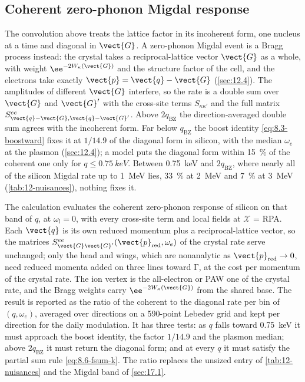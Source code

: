 \subsection{Coherent zero-phonon Migdal response}

The convolution above treats the lattice factor in its incoherent form, one nucleus at a time and diagonal in $\vect{G}$. A zero-phonon Migdal event is a Bragg process instead: the crystal takes a reciprocal-lattice vector $\vect{G}$ as a whole, with weight $\ee^{-2W_\kappa(\vect{G})}$ and the structure factor of the cell, and the electrons take exactly $\vect{p} = \vect{q} - \vect{G}$ (\cref{sec:12.4}). The amplitudes of different $\vect{G}$ interfere, so the rate is a double sum over $\vect{G}$ and $\vect{G}'$ with the cross-site terms $S_{\kappa\kappa'}$ and the full matrix $S^{ee}_{\vect{q}-\vect{G},\vect{q}-\vect{G}'}$. Above $2q_{\mathrm{BZ}}$ the direction-averaged double sum agrees with the incoherent form. Far below $q_{\mathrm{BZ}}$ the boost identity \cref{eq:8.3-boostward} fixes it at $1/14.9$ of the diagonal form in silicon, with the median $\omega_e$ at the plasmon (\cref{sec:12.4}); a model puts the diagonal form within \SI{15}{\percent} of the coherent one only for $q \le \SI{0.75}{keV}$. Between \SI{0.75}{keV} and $2q_{\mathrm{BZ}}$, where nearly all of the silicon Migdal rate up to \SI{1}{MeV} lies, \SI{33}{\percent} at \SI{2}{MeV} and \SI{7}{\percent} at \SI{3}{MeV} (\cref{tab:12-nuisances}), nothing fixes it.

The calculation evaluates the coherent zero-phonon response of silicon on that band of $q$, at $\omega_l = 0$, with every cross-site term and local fields at $\mathcal{X}$ = RPA. Each $\vect{q}$ is its own reduced momentum plus a reciprocal-lattice vector, so the matrices $S^{ee}_{\vect{G}\vect{G}'}(\vect{p}_{\mathrm{red}},\omega_e)$ of the crystal rate serve unchanged; only the head and wings, which are nonanalytic as $\vect{p}_{\mathrm{red}}\to0$, need reduced momenta added on three lines toward $\mathrm{\Gamma}$, at the cost per momentum of the crystal rate. The ion vertex is the all-electron or PAW one of the crystal rate, and the Bragg weights carry $\ee^{-2W_\kappa(\vect{G})}$ from the shared base. The result is reported as the ratio of the coherent to the diagonal rate per bin of $(q,\omega_e)$, averaged over directions on a 590-point Lebedev grid and kept per direction for the daily modulation. It has three tests: as $q$ falls toward \SI{0.75}{keV} it must approach the boost identity, the factor $1/14.9$ and the plasmon median; above $2q_{\mathrm{BZ}}$ it must return the diagonal form; and at every $q$ it must satisfy the partial sum rule \cref{eq:8.6-fsum-k}. The ratio replaces the unsized entry of \cref{tab:12-nuisances} and the Migdal band of \cref{sec:17.1}.

